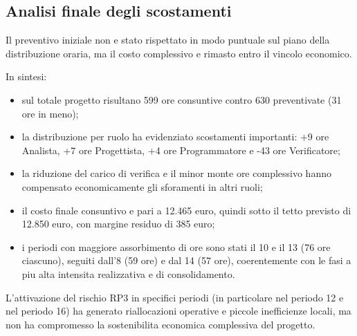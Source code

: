 \documentclass[a4paper, 11pt, oneside]{scrartcl} %
\begin{document}
\subsection{Analisi finale degli scostamenti}

Il preventivo iniziale non e stato rispettato in modo puntuale sul piano della distribuzione oraria, ma il costo complessivo e rimasto entro il vincolo economico.

In sintesi:
\begin{itemize}[noitemsep, topsep=2pt]
        \item sul totale progetto risultano 599 ore consuntive contro 630 preventivate (31 ore in meno);
        \item la distribuzione per ruolo ha evidenziato scostamenti importanti: +9 ore Analista, +7 ore Progettista, +4 ore Programmatore e -43 ore Verificatore;
        \item la riduzione del carico di verifica e il minor monte ore complessivo hanno compensato economicamente gli sforamenti in altri ruoli;
        \item il costo finale consuntivo e pari a 12.465 euro, quindi sotto il tetto previsto di 12.850 euro, con margine residuo di 385 euro;
        \item i periodi con maggiore assorbimento di ore sono stati il 10 e il 13 (76 ore ciascuno), seguiti dall'8 (59 ore) e dal 14 (57 ore), coerentemente con le fasi a piu alta intensita realizzativa e di consolidamento.
\end{itemize}

L'attivazione del rischio RP3 in specifici periodi (in particolare nel periodo 12 e nel periodo 16) ha generato riallocazioni operative e piccole inefficienze locali, ma non ha compromesso la sostenibilita economica complessiva del progetto.
\end{document}
